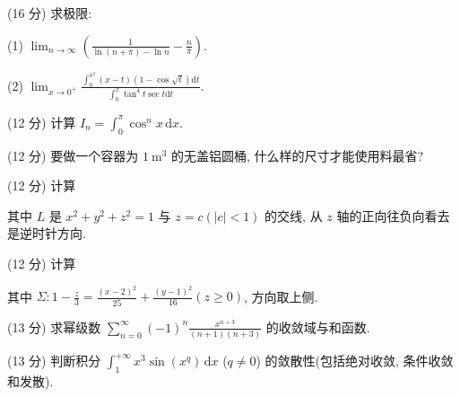 (16 分) 求极限:\par
(1) $\lim_{n\to \infty}\left(\frac{1}{\ln(n + \pi) - \ln n} -\frac{n}{\pi}\right).$\par
(2) $\lim_{x\to 0^{+}}\frac{\int_0^{x^2}(x - t)(1 - \cos\sqrt{t})\mathrm{d}t}{\int_0^x\tan^4 t\sec t\mathrm{d}t}.$\par
(12 分) 计算 $I_{n} = \int_{0}^{\pi} \cos^{n} x \, \mathrm{d}x$.\par
(12 分) 要做一个容器为 $1 \mathrm{~m}^{3}$ 的无盖铝圆桶, 什么样的尺寸才能使用料最省?\par
\par{}
(12 分) 计算\par
\nopagebreak[4]
其中 $L$ 是 $x^{2} + y^{2} + z^{2} = 1$ 与 $z = c(|c| < 1)$ 的交线, 从 $z$ 轴的正向往负向看去是逆时针方向.\par
\par{}
(12 分) 计算\par
\nopagebreak[4]
其中 $\Sigma: 1 - \frac{z}{3} = \frac{(x - 2)^2}{25} + \frac{(y - 1)^2}{16} (z \geq 0)$, 方向取上侧.\par
(13 分) 求幂级数 $\sum_{n=0}^{\infty} (-1)^{n} \frac{x^{n+3}}{(n+1)(n+3)}$ 的收敛域与和函数.\par
(13 分) 判断积分 $\int_{1}^{+\infty} x^{3} \sin(x^{q}) \, \mathrm{d}x$ ($q \neq 0$) 的敛散性(包括绝对收敛, 条件收敛和发散).\par
